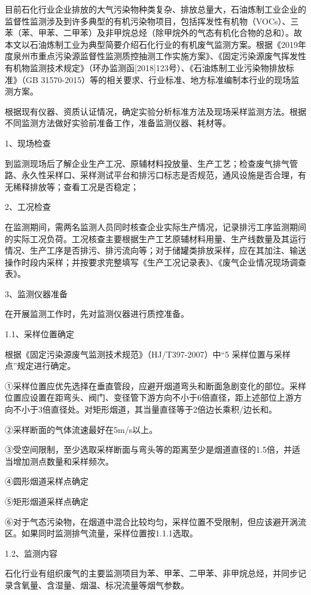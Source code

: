 \documentclass[]{book}
\begin{document}
目前石化行业企业排放的大气污染物种类复杂、排放总量大，石油炼制工业企业的监督性监测涉及到许多典型的有机污染物项目，包括挥发性有机物（VOCs）、三苯（苯、甲苯、二甲苯）及非甲烷总烃（除甲烷外的气态有机化合物的总和）。故本文以石油炼制工业为典型简要介绍石化行业的有机废气监测方案。根据《2019年度泉州市重点污染源监督性监测质控抽测工作实施方案》、《固定污染源废气挥发性有机物监测技术规定》（环办监测函{[}2018{]}123号）、《石油炼制工业污染物排放标准》（GB 31570-2015）等的相关要求、行业标准、地方标准编制本行业的现场监测方案。

根据现有仪器、资质认证情况，确定实验分析标准方法及现场采样监测方法。根据不同监测方法做好实验前准备工作，准备监测仪器、耗材等。

1、现场检查

到监测现场后了解企业生产工况、原辅材料投放量、生产工艺；检查废气排气管路、永久性采样口、采样测试平台和排污口标志是否规范，通风设施是否合理，有无稀释排放等；查看工况是否稳定；

2、工况检查

在监测期间，需两名监测人员同时核查企业实际生产情况，记录排污工序监测期间的实际工况负荷。工况核查主要根据生产工艺原辅材料用量、生产线数量及其运行情况、生产工序是否排污、排污流向等；对于储罐类排放采样，应在其加注、输送操作时段内采样；并按要求完整填写《生产工况记录表》、《废气企业情况现场调查表》。

3、监测仪器准备

在开展监测工作时，先对监测仪器进行质控准备。

1.1、采样位置确定

根据《固定污染源废气监测技术规范》（HJ/T397-2007）中``5 采样位置与采样点''规定进行确定。

①采样位置应优先选择在垂直管段，应避开烟道弯头和断面急剧变化的部位。采样位置应设置在距弯头、阀门、变径管下游方向不小于6倍直径，距上述部位上游方向不小于3倍直径处。对矩形烟道，其当量直径等于2倍边长乘积/边长和。

②采样断面的气体流速最好在5m/s以上。

③受空间限制，至少选取采样断面与弯头等的距离至少是烟道直径的1.5倍，并适当增加测点数量和采样频次。

④圆形烟道采样点确定

⑤矩形烟道采样点确定

⑥对于气态污染物，在烟道中混合比较均匀，采样位置不受限制，但应该避开涡流区。如果同时监测排气流量，采样位置按1.1.1选取。

1.2、监测内容

石化行业有组织废气的主要监测项目为苯、甲苯、二甲苯、非甲烷总烃，并同步记录含氧量、含湿量、烟温、标况流量等烟气参数。
\end{document}
